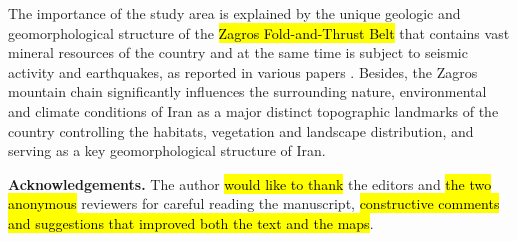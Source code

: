 \documentclass[12pt,a4paper,oneside]{article}
\def \newsection{\vspace{12pt}\textbf}
\def \newpar{\vspace{6pt}}
\begin{document}
\newpar The importance of the study area is explained by the unique geologic and geomorphological structure of the \hl{Zagros Fold-and-Thrust Belt} that contains vast mineral resources of the country \citep{Sepehr,Regard,Motaghi2017,Saura} and at the same time is subject to seismic activity and earthquakes, as reported in various papers \citep{Paul,Nissen,Yamini,Tavakoli,Talebian}. Besides, the Zagros mountain chain significantly influences the surrounding nature, environmental and climate conditions of Iran as a major distinct topographic landmarks of the country controlling the habitats, vegetation and landscape distribution, and serving as a key geomorphological structure of Iran. 

\vspace{12pt}

{\bf Acknowledgements.} The author \hl{would like to thank }the editors and \hl{the two anonymous }reviewers for careful reading the manuscript, \hl{constructive comments and suggestions that improved both the text and the maps}.


%
%
%


\end{document}

